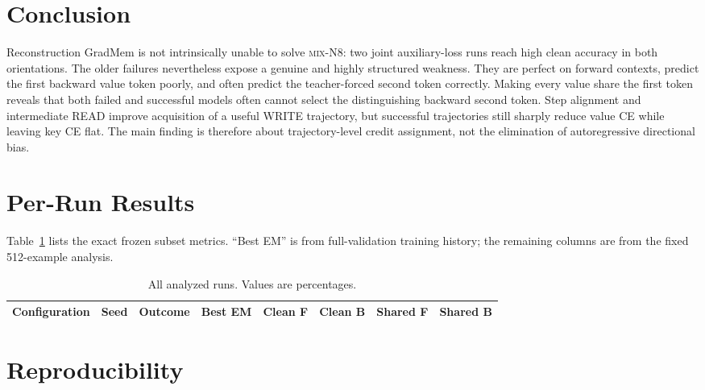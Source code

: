 \documentclass{article}
\newcommand{\dataset}{\textsc{mix-N8}}
\newcommand{\gm}{GradMem}
\begin{document}
\section{Conclusion}

Reconstruction \gm{} is not intrinsically unable to solve \dataset{}: two joint auxiliary-loss runs reach high clean accuracy in both orientations.  The older failures nevertheless expose a genuine and highly structured weakness.  They are perfect on forward contexts, predict the first backward value token poorly, and often predict the teacher-forced second token correctly.  Making every value share the first token reveals that both failed and successful models often cannot select the distinguishing backward second token.  Step alignment and intermediate READ improve acquisition of a useful WRITE trajectory, but successful trajectories still sharply reduce value CE while leaving key CE flat.  The main finding is therefore about trajectory-level credit assignment, not the elimination of autoregressive directional bias.

\appendix
\section{Per-Run Results}

Table~\ref{tab:runs} lists the exact frozen subset metrics.  ``Best EM'' is from full-validation training history; the remaining columns are from the fixed 512-example analysis.

\begin{table}[h]
  \caption{All analyzed runs.  Values are percentages.}
  \label{tab:runs}
  \centering
  \scriptsize
  \begin{tabular}{lrlrrrrr}
    \toprule
    Configuration & Seed & Outcome & Best EM & Clean F & Clean B & Shared F & Shared B \\
    \midrule
    
    \bottomrule
  \end{tabular}
\end{table}

\section{Reproducibility}
\end{document}
